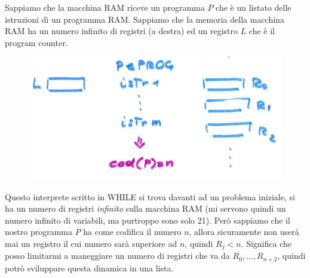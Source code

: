 \documentclass{article}
\begin{document}
Sappiamo che la macchina RAM riceve un programma $P$ che è un listato delle istruzioni di un programma
RAM. Sappiamo che la memoria della macchina RAM ha un numero infinito di registri
(a destra) ed un registro $L$ che è il program counter.
\begin{figure}[H]
    \centering
    \includegraphics[scale=0.5]{images/interprete_while_ram.png}
\end{figure}
Questo interprete scritto in WHILE si trova davanti ad un problema iniziale, si ha un
numero di registri \textit{infinito} sulla macchina RAM (mi servono quindi un
numero infinito di variabili, ma purtroppo sono solo 21). Però sappiamo che il
nostro programma $P$ ha come codifica il numero $n$, allora sicuramente non userà
mai un registro il cui numero sarà superiore ad $n$, quindi $R_j<n$. Significa
che posso limitarmi a maneggiare un numero di registri che va da $R_0,\dots,R_{n+2}$,
quindi potrò sviluppare questa dinamica in una lista.
\end{document}
